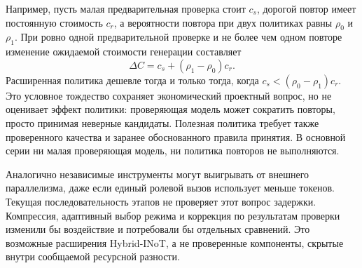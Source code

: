 Например, пусть малая предварительная проверка стоит $c_s$, дорогой повтор имеет постоянную стоимость $c_r$, а вероятности повтора при двух политиках равны $\rho_0$ и $\rho_1$. При ровно одной предварительной проверке и не более чем одном повторе изменение ожидаемой стоимости генерации составляет
\begin{equation}
\Delta C=c_s+(\rho_1-\rho_0)c_r.
\label{eq:hybrid-screen}
\end{equation}
Расширенная политика дешевле тогда и только тогда, когда $c_s<(\rho_0-\rho_1)c_r$. Это условное тождество сохраняет экономический проектный вопрос, но не оценивает эффект политики: проверяющая модель может сократить повторы, просто принимая неверные кандидаты. Полезная политика требует также проверенного качества и заранее обоснованного правила принятия. В основной серии ни малая проверяющая модель, ни политика повторов не выполняются.

Аналогично независимые инструменты могут выигрывать от внешнего параллелизма, даже если единый ролевой вызов использует меньше токенов. Текущая последовательность этапов не проверяет этот вопрос задержки. Компрессия, адаптивный выбор режима и коррекция по результатам проверки изменили бы воздействие и потребовали бы отдельных сравнений. Это возможные расширения Hybrid-INoT, а не проверенные компоненты, скрытые внутри сообщаемой ресурсной разности.
